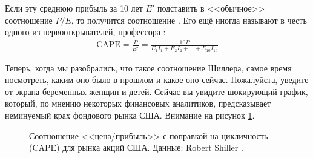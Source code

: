 Если эту среднюю прибыль за 10 лет $E'$ подставить в <<обычное>> соотношение $P/E$, то получится соотношение . Его ещё иногда называют  в честь одного из первооткрывателей, профессора  \cite{campbell1988dividend}:
\begin{align}
\text{CAPE} = \frac{P}{E'} = \frac{10P}{E_1I_1 + E_2I_2 + ... + E_{10}I_{10}}
\label{cape_formula}
\end{align}

Теперь, когда мы разобрались, что такое соотношение Шиллера, самое время посмотреть, каким оно было в прошлом и какое оно сейчас. Пожалуйста, уведите от экрана беременных женщин и детей. Сейчас вы увидите шокирующий график, который, по мнению некоторых  финансовых аналитиков, предсказывает неминуемый крах фондового рынка США. Внимание на рисунок \ref{shiller_pe_historical_chart}.



\newcommand{\dotWithNumber}[5] {
        \node[
            circle,
            fill,
            inner sep = 2pt,
            color = #3
        ]
        at (axis cs: #1, #2) {};
        
        \node[
            anchor=#5
        ]
        at (axis cs: #1, #2)
        {#4};
}



\begin{figure}[ht]
\centering
{}
\caption{Соотношение <<цена/прибыль>> с поправкой на цикличность (CAPE) для рынка акций США. Данные: Robert Shiller \cite{shillerOnline}.}
\label{shiller_pe_historical_chart}
\end{figure}

